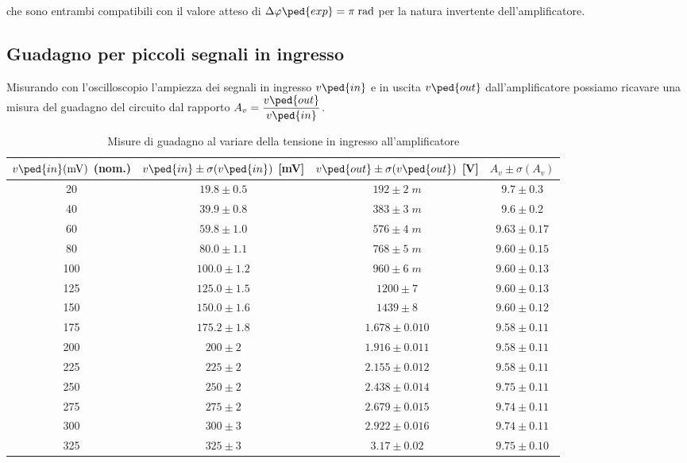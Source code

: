 \documentclass[10pt,a4paper]{article}
\begin{document}
che sono entrambi compatibili con il valore atteso di $\Delta \phi\ped{exp}
= \pi \; \si{\radian}$ per la natura invertente dell'amplificatore.

\subsection{Guadagno per piccoli segnali in ingresso}
Misurando con l'oscilloscopio l'ampiezza dei segnali in ingresso $v\ped{in}$
e in uscita $v\ped{out}$ dall'amplificatore possiamo ricavare una misura del
guadagno del circuito dal rapporto $A_v = \dfrac{v\ped{out}}{v\ped{in}}$.
\begin{table}[htb]
\centering
\begin{tabular}{cccc}
\toprule
$v\ped{in}(\si{m\V})$ (nom.) & $v\ped{in} \pm \sigma(v\ped{in})$ [mV] & $v\ped{out} \pm \sigma(v\ped{out})$ [V] & $A_v \pm \sigma(A_v)$ \\
\midrule
\midrule
20 & $19.8 \pm 0.5$ & $192 \pm 2 \; \si{m}$ & $9.7 \pm 0.3$ \\
40 & $39.9 \pm 0.8$ & $383 \pm 3 \; \si{m}$ & $9.6 \pm 0.2$ \\
60 & $59.8 \pm 1.0$ & $576 \pm 4 \; \si{m}$ & $9.63 \pm 0.17$ \\
80 & $80.0 \pm 1.1$ & $768 \pm 5 \; \si{m}$ & $9.60 \pm 0.15$ \\
100 & $100.0 \pm 1.2$ & $960 \pm 6 \; \si{m}$ & $9.60 \pm 0.13$ \\
125 & $125.0 \pm 1.5$ & $1200 \pm 7$ & $9.60 \pm 0.13$ \\
150 & $150.0 \pm 1.6$ & $1439 \pm 8$ & $9.60 \pm 0.12$ \\
175 & $175.2 \pm 1.8$ & $1.678 \pm 0.010$ & $9.58 \pm 0.11$ \\
200 & $200 \pm 2$ & $1.916 \pm 0.011$ & $9.58 \pm 0.11$ \\
225 & $225 \pm 2$ & $2.155 \pm 0.012$ & $9.58 \pm 0.11$ \\
250 & $250 \pm 2$ & $2.438 \pm 0.014$ & $9.75 \pm 0.11$ \\
275 & $275 \pm 2$ & $2.679 \pm 0.015$ & $9.74 \pm 0.11$ \\
300 & $300 \pm 3$ & $2.922 \pm 0.016$ & $9.74 \pm 0.11$ \\
325 & $325 \pm 3$ & $3.17 \pm 0.02$ & $9.75\pm 0.10$ \\
\bottomrule
\end{tabular} 
\caption{Misure di guadagno al variare della tensione in ingresso
all'amplificatore \label{tab: bjtmes}}
\end{table}
\end{document}
